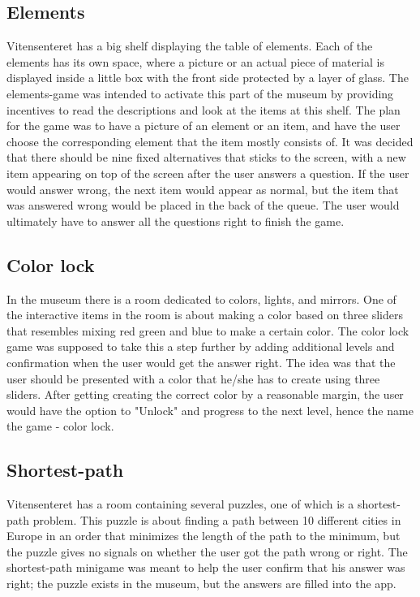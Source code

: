 \subsection{Elements}
Vitensenteret has a big shelf displaying the table of elements. Each of the elements has its own space, where a picture or an actual piece of material is displayed inside a little box with the front side protected by a layer of glass. The elements-game was intended to activate this part of the museum by providing incentives to read the descriptions and look at the items at this shelf. The plan for the game was to have a picture of an element or an item, and have the user choose the corresponding element that the item mostly consists of. It was decided that there should be nine fixed alternatives that sticks to the screen, with a new item appearing on top of the screen after the user answers a question. If the user would answer wrong, the next item would appear as normal, but the item that was answered wrong would be placed in the back of the queue. The user would ultimately have to answer all the questions right to finish the game.

\subsection{Color lock}
In the museum there is a room dedicated to colors, lights, and mirrors. One of the interactive items in the room is about making a color based on three sliders that resembles mixing red green and blue to make a certain color. The color lock game was supposed to take this a step further by adding additional levels and confirmation when the user would get the answer right. The idea was that the user should be presented with a color that he/she has to create using three sliders. After getting creating the correct color by a reasonable margin, the user would have the option to "Unlock" and progress to the next level, hence the name the game - color lock.

\subsection{Shortest-path}
Vitensenteret has a room containing several puzzles, one of which is a shortest-path problem. This puzzle is about finding a path between 10 different cities in Europe in an order that minimizes the length of the path to the minimum, but the puzzle gives no signals on whether the user got the path wrong or right. The shortest-path minigame was meant to help the user confirm that his answer was right; the puzzle exists in the museum, but the answers are filled into the app.

